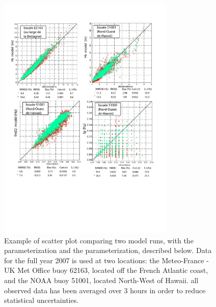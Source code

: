 \begin{figure}[htb]
\centerline{\includegraphics[width=0.75\textwidth]{FIGS_CH_MODEL/62163_51001_errors.pdf}}
\caption{Example of scatter plot comparing two model runs, with the \cite{Bidlot&al.2005} parameterization 
and the \cite{Ardhuin&al.2010} parameterization, described below. Data for the full year 2007 is used 
at two locations: the  Meteo-France - UK Met Office buoy 
62163, located off the French Atlantic coast, and the NOAA buoy  51001, located North-West of  Hawaii. all observed data 
has been averaged over 3 hours in order to reduce statistical uncertainties.} \label{fig_62163}
\end{figure}




 

